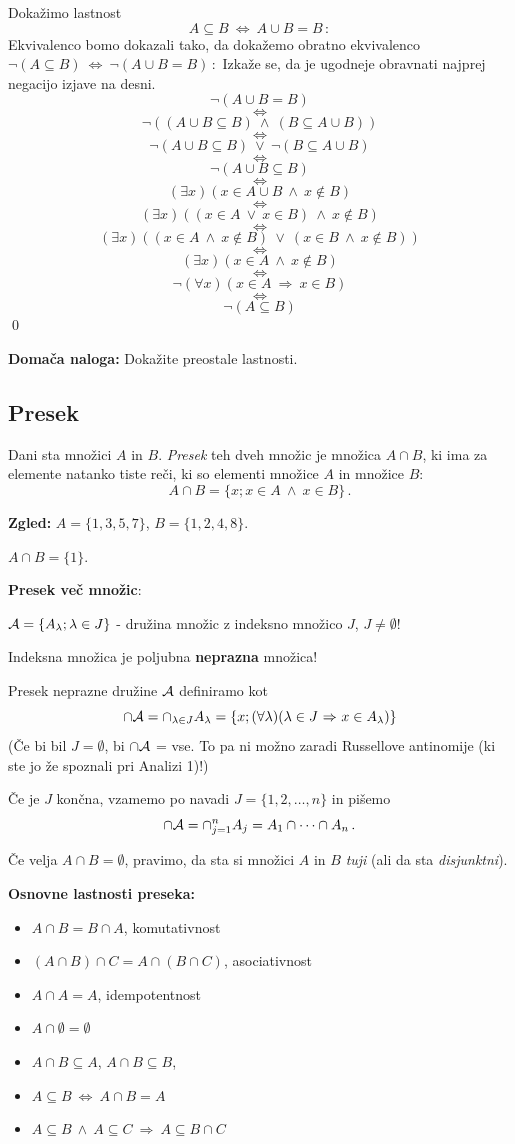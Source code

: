 \documentclass[11pt,paper=b5,footinclude,headinclude]{scrbook} %
\def\ali {{~\vee~}}
\def\inn {{~\wedge~}}
\def\sledi {{~\Rightarrow~}}
\def\cee {{~\Leftrightarrow~}}
\begin{document}
\bigskip
Dokažimo lastnost
$$A\subseteq B\cee A\cup B = B\,:$$
\medskip
Ekvivalenco bomo dokazali tako, da dokažemo obratno ekvivalenco
$\neg(A\subseteq B)\cee \neg(A\cup B = B)\,:$
Izkaže se, da je ugodneje obravnati najprej negacijo izjave na desni.
$$\neg(A\cup B = B)$$
$$\cee$$
$$\neg((A\cup B \subseteq B)\inn (B \subseteq A\cup B))$$
$$\cee$$
$$\neg(A\cup B \subseteq B) \ali \neg(B \subseteq A\cup B) $$
$$\cee$$
$$\neg(A\cup B \subseteq B)$$
$$\cee$$
$$(\exists x)(x\in A\cup B\inn x\not\in B)$$
$$\cee$$
$$(\exists x)((x\in A \ali x\in B)\inn x\not\in B)$$
$$\cee$$
$$(\exists x)((x\in A \inn x\not\in B) \ali (x\in B \inn x\not\in B))$$
$$\cee$$
$$(\exists x)(x\in A \inn x\not\in B)$$
$$\cee$$
$$\neg(\forall x)(x\in A\sledi x\in B)$$
$$\cee$$
$$\neg(A\subseteq B)$$
\qed

\bigskip
\textbf{ Domača naloga:} Dokažite preostale lastnosti.
\bigskip

\subsection{Presek}
Dani sta množici $A$ in $B$. {\em Presek} teh dveh množic je množica $A\cap B$, ki ima za elemente natanko tiste reči, ki so elementi množice $A$ in množice $B$:
$$A\cap B = \{x; x\in A \inn x\in B\}\,.$$

\textbf{ Zgled:}
$A = \{1,3,5,7\}$, $B = \{1,2,4,8\}$.

$A\cap B = \{1\}$.

\medskip

\textbf{ Presek več množic}:

${\cal A} = \{A_\lambda; \lambda \in J\}$ - družina množic z indeksno množico $J$, $J\neq \emptyset$!

Indeksna množica je poljubna \textbf{ neprazna} množica!

Presek neprazne družine ${\cal A}$ definiramo kot
$$\cap {\cal A} = \cap_{\lambda \in J} A_\lambda = \{x;(\forall\lambda) (\lambda \in J\sledi x\in A_\lambda)\}$$
(Če bi bil $J = \emptyset$, bi $\cap {\cal A}$ = vse. To pa ni možno zaradi Russellove antinomije (ki ste jo že spoznali pri Analizi 1)!)

\medskip
Če je $J$ končna, vzamemo po navadi $J = \{1,2,\ldots, n\}$ in pišemo
$$\cap {\cal A} = \cap_{j = 1}^nA_j = A_1\cap\cdots\cap A_n\,.$$

Če velja
$A\cap B = \emptyset$, pravimo, da sta si množici $A$ in $B$ {\em tuji}
(ali da sta {\em disjunktni}).

\bigskip
\textbf{ Osnovne lastnosti preseka:}
\begin{itemize}
  \item $A\cap B = B\cap A$, komutativnost
  \item $(A\cap B)\cap C = A\cap (B\cap C)$, asociativnost
  \item $A\cap A = A$, idempotentnost
  \item $A\cap \emptyset = \emptyset$
  \item $A\cap B\subseteq A$, $A\cap B\subseteq B$,
  \item $A\subseteq B\cee A\cap B = A$
  \item $A\subseteq B\inn A\subseteq C\sledi A \subseteq B\cap C$
\end{itemize}
\end{document}
